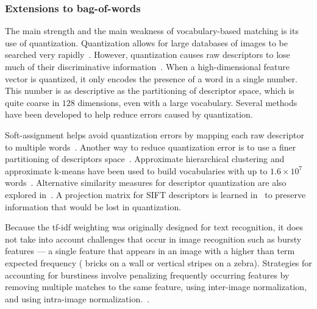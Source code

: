         \subsubsection{Extensions to bag-of-words}
            The main strength and the main weakness of vocabulary-based matching is its use of quantization.
            Quantization allows for large databases of images to be searched very
            rapidly~\cite{nister_scalable_2006}. However, quantization causes raw descriptors to lose much of their
            discriminative information~\cite{philbin_lost_2008, boiman_defense_2008}. When a high-dimensional
            feature vector is quantized, it only encodes the presence of a word in a single number. This number is
            as descriptive as the partitioning of descriptor space, which is quite coarse in $128$ dimensions, even
            with a large vocabulary. Several methods have been developed to help reduce errors caused by
            quantization.

            Soft-assignment helps avoid quantization errors by mapping each raw descriptor to multiple
            words~\cite{philbin_lost_2008}. Another way to reduce quantization error is to use a finer partitioning
            of descriptors space~\cite{philbin_object_2007}. Approximate hierarchical clustering and approximate
            k-means have been used to build vocabularies with up to $1.6 \times 10^7$
            words~\cite{nister_scalable_2006, philbin_object_2007, mikulik_learning_2010}. Alternative similarity
            measures for descriptor quantization are also explored in~\cite{mikulik_learning_2010}. A projection
            matrix for SIFT descriptors is learned in~\cite{philbin_descriptor_2010} to preserve information that
            would be lost in quantization.

            Because the tf-idf weighting was originally designed for text recognition, it does not take into
            account challenges that occur in image recognition such as bursty features --- a single feature that
            appears in an image with a higher than term expected frequency (\eg{} bricks on a wall or vertical
            stripes on a zebra). Strategies for accounting for burstiness involve penalizing frequently occurring
            features by removing multiple matches to the same feature, using inter-image normalization, and using
            intra-image normalization.~\cite{jegou_burstiness_2009}.
            
